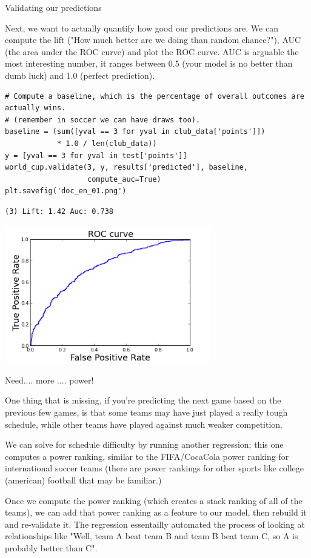 \documentclass[12pt,fleqn]{article}\usepackage{common}
\begin{document}
Validating our predictions

Next, we want to actually quantify how good our predictions are. We can
compute the lift ("How much better are we doing than random chance?"), AUC
(the area under the ROC curve) and plot the ROC curve. AUC is arguable the
most interesting number, it ranges between 0.5 (your model is no better
than dumb luck) and 1.0 (perfect prediction).

\begin{verbatim}
# Compute a baseline, which is the percentage of overall outcomes are actually wins.
# (remember in soccer we can have draws too).
baseline = (sum([yval == 3 for yval in club_data['points']]) 
            * 1.0 / len(club_data))
y = [yval == 3 for yval in test['points']]
world_cup.validate(3, y, results['predicted'], baseline, 
                   compute_auc=True)
plt.savefig('doc_en_01.png')
\end{verbatim}

\begin{verbatim}
(3) Lift: 1.42 Auc: 0.738
\end{verbatim}

\includegraphics[height=6cm]{doc_en_01.png}

Need.... more .... power!

One thing that is missing, if you're predicting the next game based on the
previous few games, is that some teams may have just played a really tough
schedule, while other teams have played against much weaker competition.

We can solve for schedule difficulty by running another regression; this
one computes a power ranking, similar to the FIFA/CocaCola power ranking
for international soccer teams (there are power rankings for other sports
like college (american) football that may be familiar.)

Once we compute the power ranking (which creates a stack ranking of all of
the teams), we can add that power ranking as a feature to our model, then
rebuild it and re-validate it. The regression essentailly automated the
process of looking at relationships like "Well, team A beat team B and team
B beat team C, so A is probably better than C".
\end{document}
